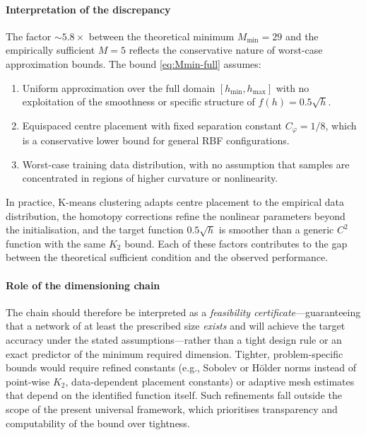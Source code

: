 \documentclass[preprint,12pt,numbers]{elsarticle}
\begin{document}
\paragraph{Interpretation of the discrepancy} The factor $\sim 5.8\times$
between the theoretical minimum $M_{\min} = 29$ and the empirically sufficient
$M = 5$ reflects the conservative nature of worst-case approximation bounds.
The bound \eqref{eq:Mmin-full} assumes:
\begin{enumerate}[label=(\roman*),leftmargin=*,topsep=2pt,itemsep=1pt]
\item Uniform approximation over the full domain $[h_{\min}, h_{\max}]$ with
      no exploitation of the smoothness or specific structure of $f(h) = 0.5\sqrt{h}$.
\item Equispaced centre placement with fixed separation constant $C_\varphi = 1/8$,
      which is a conservative lower bound for general RBF configurations.
\item Worst-case training data distribution, with no assumption that samples
      are concentrated in regions of higher curvature or nonlinearity.
\end{enumerate}
In practice, K-means clustering adapts centre placement to the empirical
data distribution, the homotopy corrections refine the nonlinear parameters
beyond the initialisation, and the target function $0.5\sqrt{h}$ is smoother
than a generic $C^2$ function with the same $K_2$ bound. Each of these
factors contributes to the gap between the theoretical sufficient condition
and the observed performance.

\paragraph{Role of the dimensioning chain} The chain should therefore be
interpreted as a \emph{feasibility certificate}---guaranteeing that a network
of at least the prescribed size \emph{exists} and will achieve the target
accuracy under the stated assumptions---rather than a tight design rule or
an exact predictor of the minimum required dimension. Tighter, problem-specific
bounds would require refined constants (e.g., Sobolev or Hölder norms instead
of point-wise $K_2$, data-dependent placement constants) or adaptive mesh
estimates that depend on the identified function itself. Such refinements
fall outside the scope of the present universal framework, which prioritises
transparency and computability of the bound over tightness.
\end{document}

